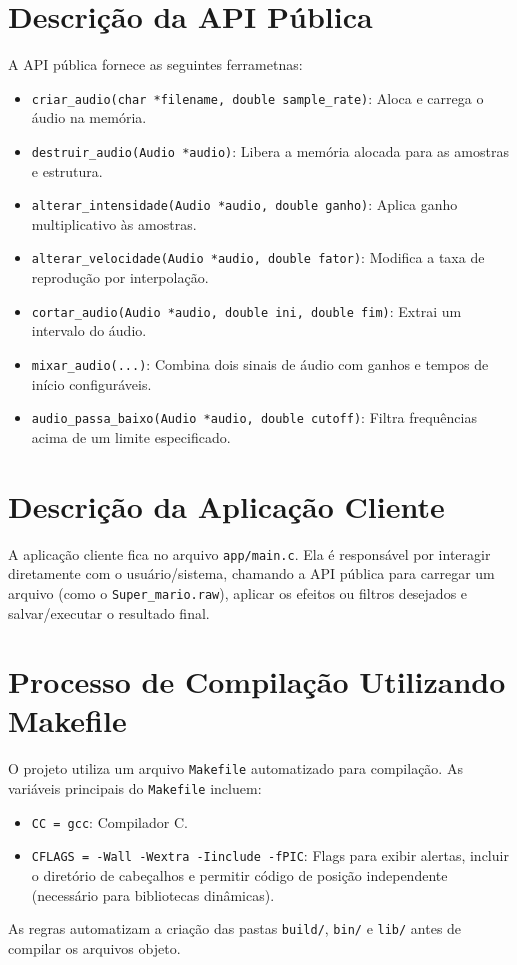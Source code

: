 \documentclass[12pt, a4paper]{article}
\begin{document}
\section{Descrição da API Pública}
A API pública fornece as seguintes ferrametnas:
\begin{itemize}
    \item \texttt{criar\_audio(char *filename, double sample\_rate)}: Aloca e carrega o áudio na memória.
    \item \texttt{destruir\_audio(Audio *audio)}: Libera a memória alocada para as amostras e estrutura.
    \item \texttt{alterar\_intensidade(Audio *audio, double ganho)}: Aplica ganho multiplicativo às amostras.
    \item \texttt{alterar\_velocidade(Audio *audio, double fator)}: Modifica a taxa de reprodução por interpolação.
    \item \texttt{cortar\_audio(Audio *audio, double ini, double fim)}: Extrai um intervalo do áudio.
    \item \texttt{mixar\_audio(...)}: Combina dois sinais de áudio com ganhos e tempos de início configuráveis.
    \item \texttt{audio\_passa\_baixo(Audio *audio, double cutoff)}: Filtra frequências acima de um limite especificado.
\end{itemize}


\section{Descrição da Aplicação Cliente}
A aplicação cliente fica no arquivo \texttt{app/main.c}. Ela é responsável por interagir diretamente com o usuário/sistema, chamando a API pública para carregar um arquivo (como o \texttt{Super\_mario.raw}), aplicar os efeitos ou filtros desejados e salvar/executar o resultado final.

\section{Processo de Compilação Utilizando Makefile}
O projeto utiliza um arquivo \texttt{Makefile} automatizado para compilação. As variáveis principais do \texttt{Makefile} incluem:
\begin{itemize}
    \item \texttt{CC = gcc}: Compilador C.
    \item \texttt{CFLAGS = -Wall -Wextra -Iinclude -fPIC}: Flags para exibir alertas, incluir o diretório de cabeçalhos e permitir código de posição independente (necessário para bibliotecas dinâmicas).
\end{itemize}
As regras automatizam a criação das pastas \texttt{build/}, \texttt{bin/} e \texttt{lib/} antes de compilar os arquivos objeto.
\end{document}
